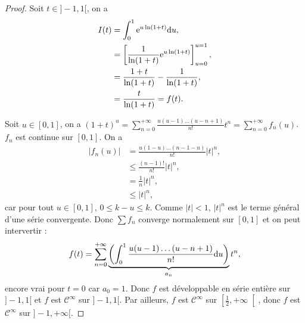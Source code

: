 \documentclass[12pt]{article}
\begin{document}
\begin{proof}
    Soit $t\in]-1,1[$, on a 
    \begin{align}
        I(t)
        &=\int_{0}^{1}\mathrm{e}^{u\ln(1+t)}\mathrm{d} u,\\
        &=\left[\frac{1}{\ln(1+t)}\mathrm{e}^{u\ln(1+t)}\right]_{u=0}^{u=1},\\
        &=\frac{1+t}{\ln(1+t)}-\frac{1}{\ln(1+t)},\\
        &=\frac{t}{\ln(1+t)}=f(t).
    \end{align}

    Soit $u\in[0,1]$, on a $(1+t)^{u}=\sum_{n=0}^{+\infty}\frac{u(u-1)\dots(u-n+1)}{n!}t^{n}=\sum_{n=0}^{+\infty}f_n(u)$. $f_n$ est continue sur $[0,1]$. On a 
    \begin{align}
        \left\lvert f_n(u)\right\rvert
        &=\frac{u(1-u)\dots(n-1-u)}{n!}\left\lvert t\right\rvert^{n},\\
        &\leqslant\frac{(n-1)!}{n!}\left\lvert t\right\rvert^{n},\\
        &=\frac{1}{n}\left\lvert t\right\rvert^{n},\\
        &\leqslant\left\lvert t\right\rvert^{n},
    \end{align}
    car pour tout $u\in[0,1]$, $0\leqslant k-u\leqslant k$. Comme $\left\lvert t\right\rvert<1$, $\left\lvert t\right\rvert^{n}$ est le terme général d'une série convergente. Donc $\sum f_{n}$ converge normalement sur $[0,1]$ et on peut intervertir :
    \begin{equation}
        f(t)=\sum_{n=0}^{+\infty}\underbrace{\left(\int_{0}^{1}\frac{u(u-1)\dots(u-n+1)}{n!}\mathrm{d} u\right)}_{a_n}t^{n},
    \end{equation}
    encore vrai pour $t=0$ car $a_{0}=1$. Donc $f$ est développable en série entière sur $]-1,1[$ et $f$ est $\mathcal{C}^{\infty}$ sur $]-1,1[$. Par ailleurs, $f$ est $\mathcal{C}^{\infty}$ sur $\left[\frac{1}{2},+\infty\right[$, donc $f$ est $\mathcal{C}^{\infty}$ sur $]-1,+\infty[$.
\end{proof}
\end{document}
